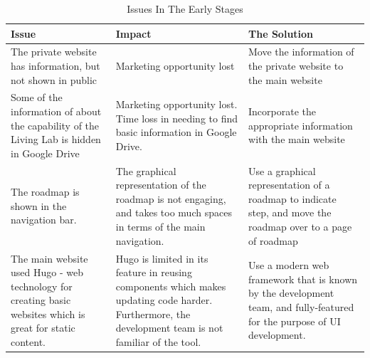 \begin{table}[htp]

\begin{center}
\begin{tabular}{  p{5cm} | p{6cm} | p{6cm} }
\textbf{Issue} & \textbf{Impact} & \textbf{The Solution} \\
\hline

 The private website has information, but not shown in public &  Marketing opportunity lost & Move the information of the private website to the main website\\ \hline

 Some of the information of about the capability of the Living Lab is hidden in Google Drive  & Marketing opportunity lost. Time loss in needing to find basic information in Google Drive. &  Incorporate the appropriate information with the main website \\ \hline

 The roadmap is shown in the navigation bar. &  The graphical representation of the roadmap is not engaging, and takes too much spaces in terms of the main navigation. & Use a graphical representation of a roadmap to indicate step, and move the roadmap over to a page of roadmap \\ \hline

 The main website used Hugo - web technology for creating basic websites which is great for static content. &  Hugo is limited in its feature in reusing components which makes updating code harder. Furthermore, the development team is not familiar of the tool. & Use a modern web framework that is known by the development team, and fully-featured for the purpose of UI development.\\ \hline

\end{tabular} \label{issues.}
\end{center}
\caption{Issues In The Early Stages} \label{issues}
\end{table}
